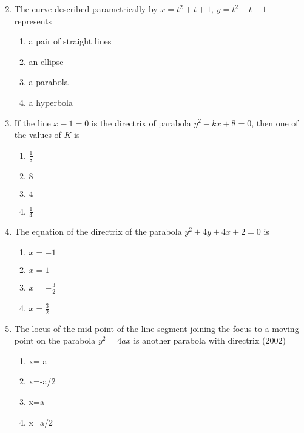 \begin{enumerate}[label=\thesubsection.\arabic*.,ref=\thesubsection.\theenumi]
\begin{multicols}{4}
\begin{enumerate}
\end{enumerate}\end{multicols}
\item The curve described parametrically by $x=t^2+t+1$, $y=t^2-t+1$ represents
     \hfill{}
										\begin{multicols}{2}
\begin{enumerate}
    \item a pair of straight lines
    \item an ellipse
    \item a parabola
    \item a hyperbola
\end{enumerate}\end{multicols}
\item If the line $x-1=0$ is the directrix of parabola $y^2-kx+8=0$, then one of the values of $K$ is
      \hfill{}
											\begin{multicols}{2}
\begin{enumerate}
    \item $\frac{1}{8}$
    \item $8$
    \item $4$
    \item $\frac{1}{4}$ 
\end{enumerate}\end{multicols}
    \item The equation of the directrix of the parabola $y^2+4y+4x+2=0$ is 
     \hfill {}
												\begin{multicols}{2}
\begin{enumerate}
    \item $x=-1$
    \item $x=1$
    \item $x=-\frac{3}{2}$
     \item $x=\frac{3}{2}$
\end{enumerate}\end{multicols}
\item The locus of the mid-point of the line segment joining the focus to a moving point on the parabola $y^{2} = 4ax$ is another parabola with directrix \hfill{(2002)}
\begin{multicols}{4}
 \begin{enumerate}
    \item x=-a
    \item x=-a/2
    \item x=a
    \item x=a/2
 \end{enumerate}

\end{multicols}
\end{enumerate}
